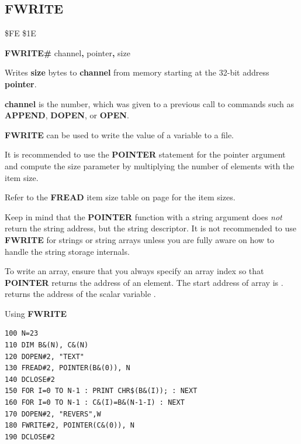 \subsection{FWRITE}
\begin{description}[leftmargin=2cm,style=nextline]
\item [Token:]    \$FE \$1E

\item [Format:]   {\bf FWRITE\#} channel{\bf,} pointer{\bf,} size

\item [Usage:]    Writes {\bf size} bytes to {\bf channel} from memory starting at the 32-bit address {\bf pointer}.

                  {\bf channel} is the number, which was given to a previous call to commands such as {\bf APPEND}, {\bf DOPEN}, or {\bf OPEN}.

                  {\bf FWRITE} can be used to write the value of a variable to a file.

                  It is recommended to use the {\bf POINTER} statement for the pointer argument and compute the size parameter by multiplying the number of elements with the item size.

                  Refer to the {\bf FREAD} item size table on page \pageref{freadtable} for the item sizes.

\item [Remarks:]  Keep in mind that the {\bf POINTER} function with a string argument does {\em not} return the string address, but the string descriptor. It is not recommended to use {\bf FWRITE} for strings or string arrays unless you are fully aware on how to handle the string storage internals.

                  To write an array, ensure that you always specify an array index so that {\bf POINTER} returns the address of an element. The start address of array  is .  returns the address of the scalar variable .

\item [Example:]  Using {\bf FWRITE}

\begin{tcolorbox}[colback=black,coltext=white]
\verbatimfont{\codefont}
\begin{verbatim}
100 N=23
110 DIM B&(N), C&(N)
120 DOPEN#2, "TEXT"
130 FREAD#2, POINTER(B&(0)), N
140 DCLOSE#2
150 FOR I=0 TO N-1 : PRINT CHR$(B&(I)); : NEXT
160 FOR I=0 TO N-1 : C&(I)=B&(N-1-I) : NEXT
170 DOPEN#2, "REVERS",W
180 FWRITE#2, POINTER(C&(0)), N
190 DCLOSE#2
\end{verbatim}
\end{tcolorbox}
\end{description}

